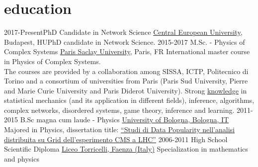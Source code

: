 \documentclass[]{cv-style}     %
\begin{document}
\section{education}
\begin{entrylist}
\entry
{2017-Present}{PhD Candidate in Network Science}
{\href{http://www.ceu.edu}{Central European University}, Budapest, HU}{PhD candidate in Network Science.}
\entry
{2015-2017}
{M.Sc. - Physics of Complex Systems%
}
{%
\href{https://www.universite-paris-saclay.fr/en}{Paris Saclay University}, Paris, FR
}
{\normalfont International master course in Physics of Complex Systems.\\
The courses are provided by a collaboration among SISSA, ICTP, Politecnico di Torino
and a consortium of universities from Paris (Paris Sud University, Pierre and Marie Curie University and Paris Diderot University).
Strong \href{http://www.lps.ens.fr/~benamar/sc/physics-of-complex-systems/}{knowledge} in statistical mechanics (and its application in different fields), inference, algorithms, complex networks, disordered systems, game theory, inference and learning.
}
\entry
{2011-2015}
{B.Sc magna cum laude - Physics}
{\href{http://http://www.unibo.it/en}{University of Bologna, Bologna, IT}}
{Majored in Physics, dissertation title:
\href{http://www.infn.it/thesis/PDF/getfile.php?filename=9796-Neri-triennale.pdf}
{``Studi di Data Popularity nell'analisi distribuita su Grid dell'esperimento CMS a LHC''}}
\entry
{2006-2011}
{High School Scientific Diploma}
{\href{http://www.liceotorricelli.it/}{Liceo Torricelli, Faenza (Italy)}}
{Specialization in mathematics and physics}
\end{entrylist}
\end{document}
